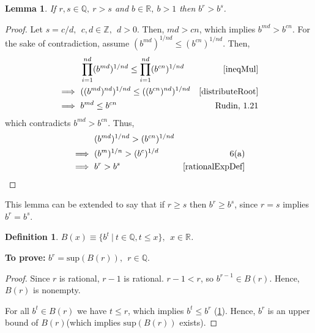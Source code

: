 \documentclass[12pt]{article}
\newtheorem{lemma}[theorem]{Lemma}
\newtheorem{definition}[theorem]{Definition}
\begin{document}
\begin {enumerate} [(a)]
\begin{lemma}
      \label{rationalExpComp}
      If $r, s \in \mathbb{Q}, \ r > s$ and $  b \in \mathbb{R}, \  b > 1$
      then $b^r > b^s$.
\end{lemma}

\begin{proof}
      Let $s = c/d, \ \  c, d \in \mathbb{Z},\ \  d>0$. Then, $md > cn$, which implies
      $b^{md} > b^{cn}$. For the sake of contradiction, assume $(b^{md})^{1/nd} \le (b^{cn})^{1/nd}$.
      Then,
      \begin{align*}
                        & \prod_{i = 1}^{nd}(b^{md})^{1/nd} \le \prod_{i = 1}^{nd}(b^{cn})^{1/nd} & \ref{ineqMul}        \\
            \implies \  & ((b^{md})^{nd})^{1/nd} \le ((b^{cn})^{nd})^{1/nd}                       & \ref{distributeRoot} \\
            \implies \  & b^{md} \le b^{cn}                                                       & \text{Rudin, 1.21}
      \end{align*}
      which contradicts $b^{md} > b^{cn}$. Thus,
      \begin{align*}
                        & (b^{md})^{1/nd} > (b^{cn})^{1/nd} &                      \\
            \implies \  & (b^m)^{1/n} > (b^c)^{1/d}         & \text{6(a)}          \\
            \implies \  & b^r > b^s                         & \ref{rationalExpDef}
      \end{align*}
\end{proof}

This lemma can be extended to say that if $r \ge s$ then $b^r \ge b^s$, since $r = s$
implies $b^r = b^s$.

\begin{definition}\label{BxDef}
      $B(x) \equiv \{b^t \ | \  t\in \mathbb{Q}, t \le x\}, \ \ x\in \mathbb{R}$.
\end{definition}

{\bf To prove:}
$b^r = \text{sup}(B(r)), \ \ r \in \mathbb{Q}$.

\begin{proof}
      Since $r$ is rational, $r-1$ is rational. $r-1 < r$, so $b^{r-1} \in B(r)$. Hence,
      $B(r)$ is nonempty.

      For all $b^t \in B(r)$ we have $t \le r$, which implies
      $b^t \le b^r$ (\ref{rationalExpComp}). Hence, $b^r$ is an upper bound of $B(r)$(which implies
      $\text{sup}(B(r))$ exists).


\end{proof}
\end{enumerate}
\end{document}
